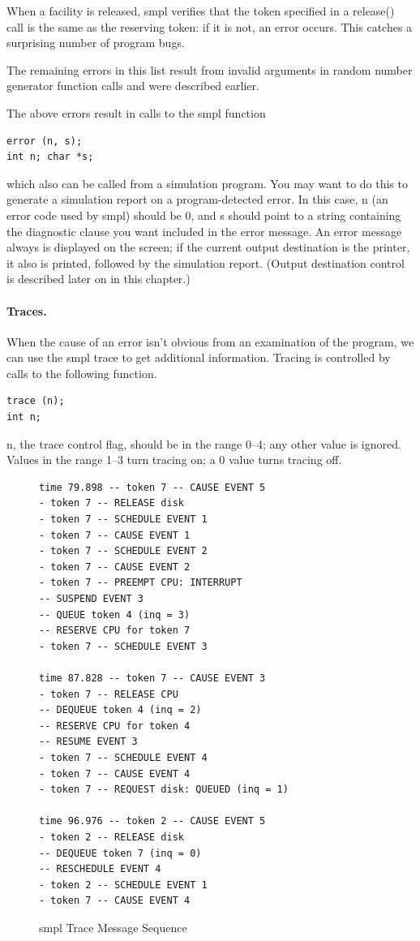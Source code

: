 When a facility is released, smpl verifies that the token specified in a
release() call is the same as the reserving token: if it is not, an error
occurs. This catches a surprising number of program bugs.

The remaining errors in this list result from invalid arguments in random
number generator function calls and were described earlier.

The above errors result in calls to the smpl function

\begin{verbatim}
error (n, s);
int n; char *s;
\end{verbatim}

which also can be called from a simulation program. You may want to do this to
generate a simulation report on a program-detected error. In this case, n (an
error code used by smpl) should be 0, and s should point to a string
containing the diagnostic clause you want included in the error message. An
error message always is displayed on the screen; if the current output
destination is the printer, it also is printed, followed by the simulation
report. (Output destination control is described later on in this chapter.)

\paragraph{Traces.}
When the cause of an error isn't obvious from an examination of the program,
we can use the smpl trace to get additional information. Tracing is controlled
by calls to the following function.

\begin{verbatim}
trace (n);
int n;
\end{verbatim}

n, the trace control flag, should be in the range 0--4; any other value is
ignored. Values in the range 1--3 turn tracing on; a 0 value turns tracing off.

\begin{figure}[ht]
\centering
\begingroup\small
\begin{verbatim}
time 79.898 -- token 7 -- CAUSE EVENT 5
- token 7 -- RELEASE disk
- token 7 -- SCHEDULE EVENT 1
- token 7 -- CAUSE EVENT 1
- token 7 -- SCHEDULE EVENT 2
- token 7 -- CAUSE EVENT 2
- token 7 -- PREEMPT CPU: INTERRUPT
-- SUSPEND EVENT 3
-- QUEUE token 4 (inq = 3)
-- RESERVE CPU for token 7
- token 7 -- SCHEDULE EVENT 3

time 87.828 -- token 7 -- CAUSE EVENT 3
- token 7 -- RELEASE CPU
-- DEQUEUE token 4 (inq = 2)
-- RESERVE CPU for token 4
-- RESUME EVENT 3
- token 7 -- SCHEDULE EVENT 4
- token 7 -- CAUSE EVENT 4
- token 7 -- REQUEST disk: QUEUED (inq = 1)

time 96.976 -- token 2 -- CAUSE EVENT 5
- token 2 -- RELEASE disk
-- DEQUEUE token 7 (inq = 0)
-- RESCHEDULE EVENT 4
- token 2 -- SCHEDULE EVENT 1
- token 7 -- CAUSE EVENT 4
\end{verbatim}
\endgroup
\caption{smpl Trace Message Sequence}
\end{figure}

